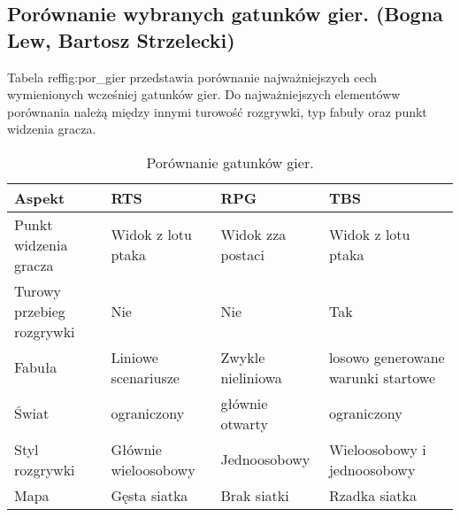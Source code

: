 \subsection{Porównanie wybranych gatunków gier. (Bogna Lew, Bartosz Strzelecki)}\label{ss:comp}
Tabela ref{fig:por_gier} przedstawia porównanie najważniejszych cech wymienionych wcześniej gatunków gier. Do
najważniejszych elementóww porównania należą między innymi turowość rozgrywki, typ fabuły oraz punkt widzenia gracza.

\begin{table}[h]
\caption{Porównanie gatunków gier.}
\begin{center}
\begin{tabular}{| m{11em} | m{10em} | m{10em} | m{10em}|} 
 \hline
 Aspekt & RTS & RPG & TBS \\
 \hline \hline
 Punkt widzenia gracza & Widok z lotu ptaka & Widok zza postaci & Widok z lotu ptaka \\
 \hline
 Turowy przebieg rozgrywki & Nie & Nie & Tak \\
 \hline
 Fabuła & Liniowe scenariusze & Zwykle nieliniowa & losowo generowane warunki startowe \\
 \hline
 Świat & ograniczony & głównie otwarty & ograniczony \\
 \hline
 Styl rozgrywki & Głównie wieloosobowy & Jednoosobowy & Wieloosobowy i jednoosobowy \\
 \hline
 Mapa & Gęsta siatka & Brak siatki & Rzadka siatka \\
 \hline
\end{tabular}
\end{center}
\label{fig:por_gier}
\end{table}

